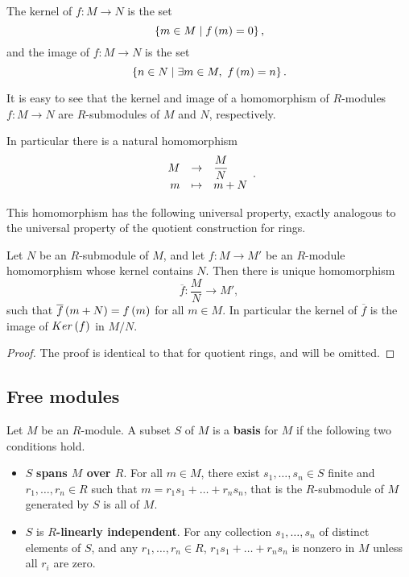 \begin{definition}
The kernel of $ f : M \to N $ is the set
$$ \left\{ m \in M \mid f\left( m \right) = 0 \right\}, $$
and the image of $ f : M \to N $ is the set
$$ \left\{ n \in N \mid \exists m \in M, \ f\left( m \right) = n \right\}. $$
\end{definition}

It is easy to see that the kernel and image of a homomorphism of $ R $-modules $ f : M \to N $ are $ R $-submodules of $ M $ and $ N $, respectively.

\begin{note*}
In particular there is a natural homomorphism
$$ \function{M}{\dfrac{M}{N}}{m}{m + N}. $$
\end{note*}

This homomorphism has the following universal property, exactly analogous to the universal property of the quotient construction for rings.

\begin{proposition}
Let $ N $ be an $ R $-submodule of $ M $, and let $ f : M \to M' $ be an $ R $-module homomorphism whose kernel contains $ N $. Then there is unique homomorphism
$$ \overline{f} : \dfrac{M}{N} \to M', $$
such that $ \overline{f}\left( m + N \right) = f\left( m \right) $ for all $ m \in M $. In particular the kernel of $ \overline{f} $ is the image of $ Ker\left( f \right) $ in $ M / N $.
\end{proposition}

\begin{proof}
The proof is identical to that for quotient rings, and will be omitted.
\end{proof}

\subsection{Free modules}

\begin{definition}
Let $ M $ be an $ R $-module. A subset $ S $ of $ M $ is a \textbf{basis} for $ M $ if the following two conditions hold.
\begin{itemize}
\item $ S $ \textbf{spans $ M $ over $ R $}. For all $ m \in M $, there exist $ s_1, \dots, s_n \in S $ finite and $ r_1, \dots, r_n \in R $ such that $ m = r_1s_1 + \dots + r_ns_n $, that is the $ R $-submodule of $ M $ generated by $ S $ is all of $ M $.
\item $ S $ is \textbf{$ R $-linearly independent}. For any collection $ s_1, \dots, s_n $ of distinct elements of $ S $, and any $ r_1, \dots, r_n \in R $, $ r_1s_1 + \dots + r_ns_n $ is nonzero in $ M $ unless all $ r_i $ are zero.
\end{itemize}
\end{definition}

